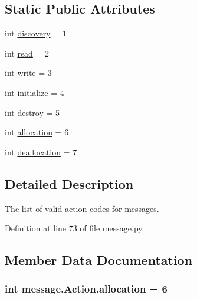 \subsection*{Static Public Attributes}
\begin{DoxyCompactItemize}
\item 
int \hyperlink{classmessage_1_1Action_ad5e8b0817a65cbd69a740a63d4fb605f}{discovery} = 1
\item 
int \hyperlink{classmessage_1_1Action_ae443e4320e909dfd9f95ed040a4c8112}{read} = 2
\item 
int \hyperlink{classmessage_1_1Action_a53a056e4ca716e69429a66251ecc3aab}{write} = 3
\item 
int \hyperlink{classmessage_1_1Action_a765e205abc0e8ab807e5ddedb5f3ef17}{initialize} = 4
\item 
int \hyperlink{classmessage_1_1Action_aadd1f9f6370743bfafe956c4522440db}{destroy} = 5
\item 
int \hyperlink{classmessage_1_1Action_a47f8d35b6f454361379a05a0fbc2d9f1}{allocation} = 6
\item 
int \hyperlink{classmessage_1_1Action_ab9cff1fcf22674639a1bd8f7d59faa98}{deallocation} = 7
\end{DoxyCompactItemize}


\subsection{Detailed Description}
\begin{DoxyVerb}The list of valid action codes for messages.
\end{DoxyVerb}
 

Definition at line 73 of file message.\+py.



\subsection{Member Data Documentation}
\hypertarget{classmessage_1_1Action_a47f8d35b6f454361379a05a0fbc2d9f1}{}
\subsubsection[{allocation}]{\setlength{\rightskip}{0pt plus 5cm}int message.\+Action.\+allocation = 6\hspace{0.3cm}{\ttfamily [static]}}\label{classmessage_1_1Action_a47f8d35b6f454361379a05a0fbc2d9f1}


